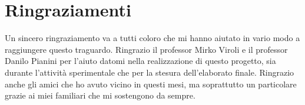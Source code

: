 
\chapter*{Ringraziamenti}
Un sincero ringraziamento va a tutti coloro che mi hanno aiutato in vario modo a raggiungere questo traguardo.
Ringrazio il professor Mirko Viroli e il professor Danilo Pianini per l'aiuto datomi nella realizzazione di questo progetto, sia durante l'attività sperimentale che per la stesura dell'elaborato finale.
Ringrazio anche gli amici che ho avuto vicino in questi mesi, ma soprattutto un particolare grazie ai miei familiari che mi sostengono da sempre.
